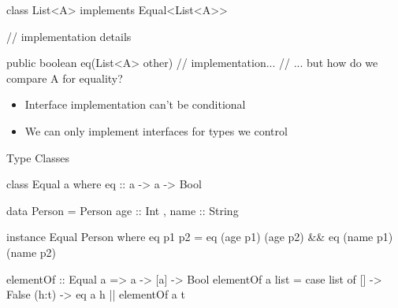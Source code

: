 \documentclass[usenames,dvipsnames,svgnames,table,aspectratio=169,mathserif]{beamer}
\newcommand{\nl}{\vspace{\baselineskip}}
\newcommand{\pnl}{\pause \nl}
\begin{document}
\begin{frame}[fragile]
\begin{javacode}
class List<A> implements Equal<List<A>> {
  // implementation details

  public boolean eq(List<A> other) {
    // implementation...
    // ... but how do we compare A for equality?
  }
}
\end{javacode}
\end{frame}


\begin{frame}
\begin{itemize}
\item Interface implementation can't be conditional
\item We can only implement interfaces for types we control
\end{itemize}

\end{frame}




\begin{frame}
\begin{center}
\huge{Type Classes}
\end{center}
\end{frame}


\begin{frame}[fragile]
\begin{haskellcode}
class Equal a where
  eq :: a -> a -> Bool
\end{haskellcode}

\pnl

\begin{haskellcode}
data Person = Person {
  age :: Int
, name :: String
}
\end{haskellcode}

\pnl

\begin{haskellcode}
instance Equal Person where
  eq p1 p2 = eq (age p1) (age p2) && eq (name p1) (name p2)
\end{haskellcode}

\end{frame}


\begin{frame}[fragile]
\begin{haskellcode}
elementOf :: Equal a => a -> [a] -> Bool
elementOf a list =
  case list of
    []    -> False
    (h:t) -> eq a h || elementOf a t
\end{haskellcode}
\end{frame}
\end{document}
